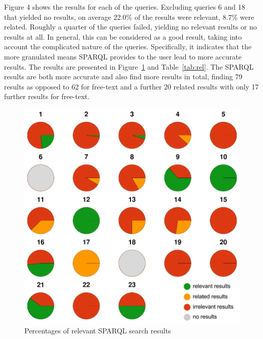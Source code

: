 \documentclass[smallextended]{svjour3}       %
\begin{document}
Figure 4 shows the results for each of the queries. Excluding queries 6 and 18
that yielded no results, on average 22.0\% of the results were relevant, 8.7\%
were related. Roughly a quarter of the queries
failed, yielding no relevant results or no results at all. In general, this can
be considered as a good result, taking into account the complicated nature of
the queries. Specifically, it indicates that the more granulated means SPARQL
provides to the user lead to more accurate results. The results are presented in
Figure~\ref{fig:sparql-rel} and Table~\ref{tab:rel}. The SPARQL results are both
more accurate and also find more results in total, finding 79 results as opposed
to 62 for free-text and a further 20 related results with only 17 further
results for free-text.

\begin{figure}
    \includegraphics[width=\textwidth]{img/eval_rel_sparql.png}
    \caption{\label{fig:sparql-rel}Percentages of relevant SPARQL search results}
\end{figure}
\end{document}
